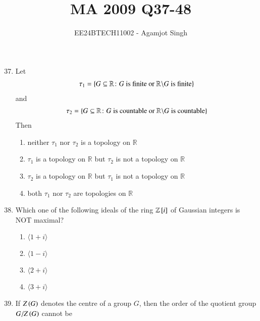 \documentclass[journal,onecolumn]{IEEEtran}
\theoremstyle{remark}
\begin{document}

\vspace{3cm}

\title{MA 2009 Q37-48}
\author{EE24BTECH11002 - Agamjot Singh}
\maketitle

\renewcommand{\thefigure}{\theenumi}
\renewcommand{\thetable}{\theenumi}

\begin{enumerate}
    \setcounter{enumi}{36}

    \item Let
	\begin{align*}
		\tau_1 = \left\{G \subseteq \mathbb{R} \colon G \text{ is finite or } \mathbb{R} \backslash G \text{ is finite}\right\}	
	\end{align*} 
	and
	\begin{align*}
		\tau_2 = \left\{G \subseteq \mathbb{R} \colon G \text{ is countable or } \mathbb{R} \backslash G \text{ is countable}\right\}	
	\end{align*}
	Then

	\begin{enumerate}
		\item neither $\tau_1$ nor $\tau_2$ is a topology on $\mathbb{R}$
		\item $\tau_1$ is a topology on $\mathbb{R}$ but $\tau_2$ is not a topology on $\mathbb{R}$
		\item $\tau_2$ is a topology on $\mathbb{R}$ but $\tau_1$ is not a topology on $\mathbb{R}$
		\item both $\tau_1$ nor $\tau_2$ are topologies on $\mathbb{R}$
	\end{enumerate}

    \item Which one of the following ideals of the ring $\mathbb{Z}{}\left[i\right]$ of Gaussian integers is NOT maximal?

	\begin{enumerate}
		\item $\langle 1 + i \rangle$
		\item $\langle 1 - i \rangle$
		\item $\langle 2 + i \rangle$
		\item $\langle 3 + i \rangle$
	\end{enumerate}

    \item If $Z\left(G\right)$ denotes the centre of a group $G$, then the order of the quotient group $G/Z\left(G\right)$ cannot be


\end{enumerate}
\end{document}
